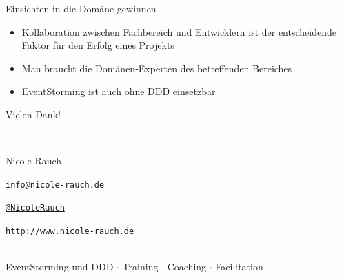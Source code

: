 \begin{frame}[fragile]{Einsichten in die Domäne gewinnen}
\begin{itemize}
\item Kollaboration zwischen Fachbereich und Entwicklern ist der entscheidende Faktor für den Erfolg eines Projekts
\item Man braucht die Domänen-Experten des betreffenden Bereiches
\item EventStorming ist auch ohne DDD einsetzbar
\end{itemize}

\end{frame}


\begin{frame}{Vielen Dank!}
        
        ~\\[1em]
        \begin{block}{Nicole Rauch}
        \begin{description}[Twitterxx]
                \item[E-Mail]  \href{mailto:info@nicole-rauch.de}{\texttt{info@nicole-rauch.de}}
                \item[Twitter] \href{http://twitter.com/NicoleRauch}{\texttt{@NicoleRauch}}
                \item[Web] \href{http://www.nicole-rauch.de}{\texttt{http://www.nicole-rauch.de}}
        \end{description}
        \end{block}
        ~\\[1em]
        EventStorming und DDD $\cdot$ Training $\cdot$ Coaching $\cdot$ Facilitation
\end{frame}


